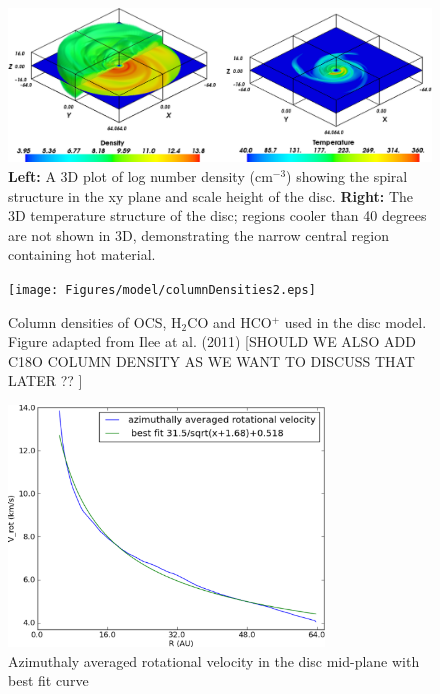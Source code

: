 \documentclass[useAMS,usenatbib]{mn2e}
\begin{document}
\begin{figure}
 \includegraphics[width=168mm]{Figures/model/rhoT6.eps}
 \caption{{\bf Left:} A 3D plot of log number density (cm$^{-3}$) showing the spiral structure in the xy plane and scale height of the disc. {\bf Right:} The 3D temperature structure of the disc; regions cooler than 40 degrees are not shown in 3D, demonstrating the narrow central region containing hot material.}
 \label{rhoT} 
\end{figure}

\begin{figure}
 \texttt{[image: Figures/model/columnDensities2.eps]}
 \caption{Column densities of OCS, H$_2$CO and HCO$^+$ used in the disc model. Figure adapted from Ilee at al. (2011) [SHOULD WE ALSO ADD C18O COLUMN DENSITY AS WE WANT TO DISCUSS THAT LATER ?? ]}
 \label{Chemistry} 
\end{figure}

\begin{figure}
 \includegraphics[width=84mm]{Figures/model/rotational_velocities.eps}
 \caption{Azimuthaly averaged rotational velocity in the disc mid-plane with best fit curve}
 \label{velocity}
\end{figure}
\end{document}
